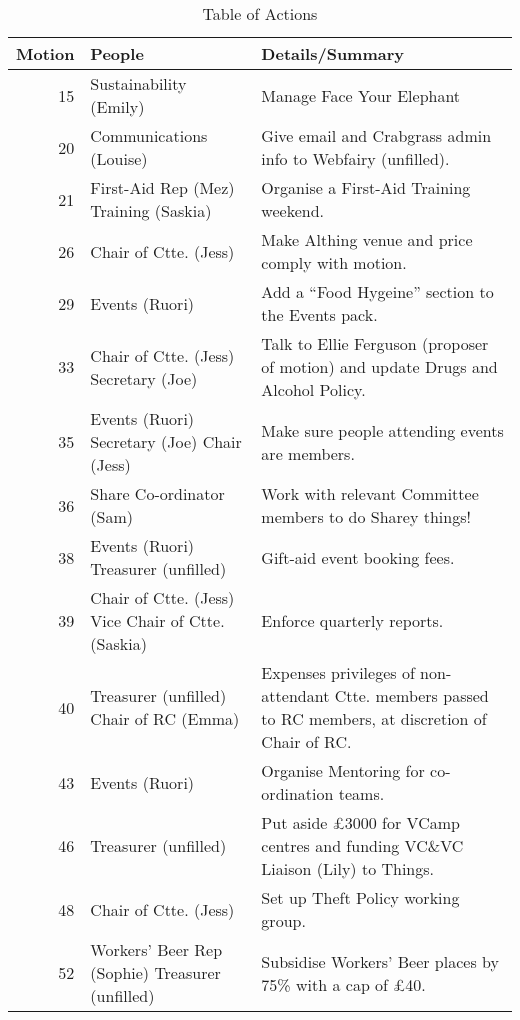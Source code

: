 \documentclass[a4paper, 12pt]{article}
\begin{document}
\begin{savenotes}
\begin{table}[H]
\centering

\begin{tabular}{ r || p{5cm} | p{8cm} }
\textbf{Motion}	& \textbf{People}	& \textbf{Details/Summary} \\ \hline
15	& Sustainability (Emily)		& Manage Face Your Elephant \\
20	& Communications (Louise)		& Give email and Crabgrass admin info to Webfairy (unfilled). \\
21	& First-Aid Rep (Mez) \newline Training (Saskia)	& Organise a First-Aid Training weekend. \\
26	& Chair of Ctte. (Jess)			& Make Althing venue and price comply with motion. \\
29	& Events (Ruori)				& Add a ``Food Hygeine'' section to the Events pack. \\
33	& Chair of Ctte. (Jess) \newline Secretary (Joe)	& Talk to Ellie Ferguson (proposer of motion) and update Drugs and Alcohol Policy. \\
35	& Events (Ruori) \newline Secretary (Joe) \newline Chair (Jess)	& Make sure people attending events are members. \\
36	& Share Co-ordinator (Sam)		& Work with relevant Committee members to do Sharey things! \\
38	& Events (Ruori) \newline Treasurer (unfilled)	& Gift-aid event booking fees. \\
39	& Chair of Ctte. (Jess) \newline Vice Chair of Ctte. (Saskia)	& Enforce quarterly reports. \\
40	& Treasurer (unfilled) \newline Chair of RC (Emma)	& Expenses privileges of non-attendant Ctte. members passed to RC members, at discretion of Chair of RC. \\
43	& Events (Ruori)				& Organise Mentoring for co-ordination teams. \\
46	& Treasurer (unfilled)			& Put aside £3000 for VCamp centres and funding VC\&VC Liaison (Lily) to Things. \\
48	& Chair of Ctte. (Jess)			& Set up Theft Policy working group. \\
52	& Workers' Beer Rep (Sophie) \newline Treasurer (unfilled)	& Subsidise Workers' Beer places by 75\% with a cap of £40. \\
\end{tabular}
\caption{Table of Actions}
\end{table}
\end{savenotes}
\end{document}
